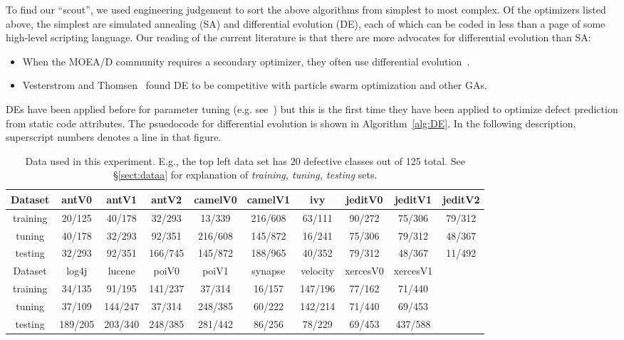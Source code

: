 \documentclass{sig-alternative}
\newcommand{\bi}{\begin{itemize}[leftmargin=0.4cm]}
\newcommand{\ei}{\end{itemize}}
\newcommand{\tion}[1]{\S\ref{sect:#1}}
\begin{document}
To find our ``scout'',  we used engineering judgement to sort  the above algorithms from simplest to most complex.
Of the optimizers listed above, the simplest are simulated annealing (SA)  and 
differential evolution (DE), each of which can be coded in less than a page of some high-level scripting language. Our reading of the current literature is that there are more  advocates for
differential evolution than
  SA:
  \bi
  \item
  When the MOEA/D community requires a secondary optimizer, they often use  differential evolution~\cite{zhang07,5583335}.
  \item
 Vesterstrom and Thomsen~\cite{Vesterstrom04} found DE to be competitive with 
   particle swarm optimization and other GAs.
   \ei
DEs have been applied before for   parameter tuning (e.g. see~\cite{omran2005differential, chiha2012tuning}) but this is the first time they have been applied to
optimize defect prediction from static code attributes.  
The psuedocode for differential evolution is shown in Algorithm~\ref{alg:DE}.
In the following description, 
    superscript numbers denotes a line in that figure.

 

 \begin{table}[!t]

\renewcommand{\baselinestretch}{0.8}
\scriptsize
\centering
  \begin{tabular}{c c c c c c c c c c }\hline
  Dataset &antV0&antV1&antV2&camelV0&camelV1&ivy&jeditV0&jeditV1&jeditV2
\\\hline
  training &20/125 &40/178 &32/293 &13/339 &216/608 &63/111 &90/272 &75/306 &79/312
\\  tuning  &40/178 &32/293 &92/351 &216/608 &145/872 &16/241 &75/306 &79/312 &48/367
\\  testing &32/293 &92/351 &166/745 &145/872 &188/965 &40/352 &79/312 &48/367 &11/492
\\ \hline
  Dataset &log4j&lucene&poiV0&poiV1&synapse&velocity&xercesV0&xercesV1
\\\hline
  training &34/135 &91/195 &141/237 &37/314 &16/157 &147/196 &77/162 &71/440
\\  tuning  &37/109 &144/247 &37/314 &248/385 &60/222 &142/214 &71/440 &69/453
\\  testing &189/205 &203/340 &248/385 &281/442 &86/256 &78/229 &69/453 &437/588
\\  \end{tabular}

   \caption{Data used in this experiment. 
   E.g., the top left data set has 20 defective classes out of 125 total.
   See \tion{dataa} for explanation of {\em training, tuning, testing} sets.
   }\label{fig:data1}
\end{table} 
\end{document}
